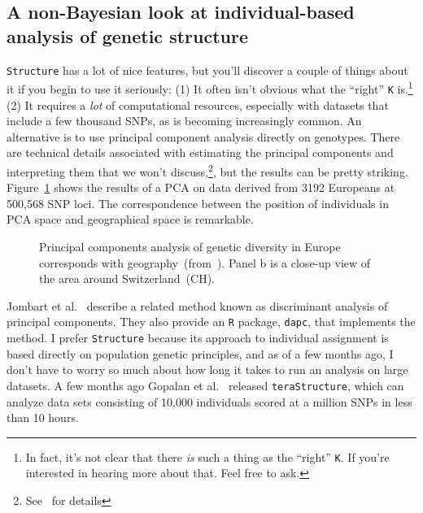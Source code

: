 \documentclass[12pt]{article}
\begin{document}
\subsection*{A non-Bayesian look at individual-based analysis of
  genetic structure}

{\tt Structure} has a lot of nice features, but you'll discover a
couple of things about it if you begin to use it seriously: (1) It
often isn't obvious what the ``right'' {\tt K} is.\footnote{In fact,
  it's not clear that there {\it is\/} such a thing as the ``right''
  {\tt K}. If you're interested in hearing more about that. Feel free
  to ask.} (2) It requires a {\it lot\/} of computational resources,
especially with datasets that include a few thousand SNPs, as is
becoming increasingly common. An alternative is to use principal
component analysis directly on genotypes. There are technical details
associated with estimating the principal components and interpreting
them that we won't discuss,\footnote{See~\cite{Novembre-Stephens-2008}
  for details}, but the results can be pretty
striking. Figure~\ref{fig:human-PCA} shows the results of a PCA on
data derived from 3192 Europeans at 500,568 SNP loci. The
correspondence between the position of individuals in PCA space and
geographical space is remarkable. 

\begin{figure}
\caption{Principal components analysis of genetic diversity in Europe
  corresponds with
  geography~(from~\cite{Novembre-etal-2008}). Panel b is a close-up
  view of the area around Switzerland~(CH).}\label{fig:human-PCA}
\end{figure}

Jombart et al.~\cite{Jombart-etal-2010} describe a related method
known as discriminant analysis of principal components. They also
provide an {\tt R} package, {\tt dapc}, that implements the
method. I
prefer {\tt Structure} because its approach to individual assignment
is based directly on population genetic principles, and as of a few
months ago, I don't have to worry so much about how long it takes to
run an analysis on large datasets. A few months ago Gopalan et
al.~\cite{Gopalan-etal-2016} released {\tt teraStructure}, which can
analyze data sets consisting of 10,000 individuals scored at a million
SNPs in less than 10 hours.




\ccLicense
\end{document}
